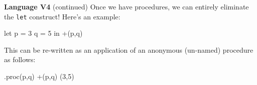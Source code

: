 \begin{minipage}[t]{\sw}
\slidenumber
\LARGE
{\bf Language V4} (continued)\exx
Once we have procedures,
we can entirely eliminate the \verb'let' construct!
Here's an example:
\Large
\begin{qv}
let
  p = 3
  q = 5
in
  +(p,q)
\end{qv}
\LARGE
This can be re-written as an application
of an anonymous (un-named) procedure as follows:
\Large
\begin{qv}
.proc(p,q) +(p,q) (3,5)
\end{qv}
\end{minipage}
\clearpage

